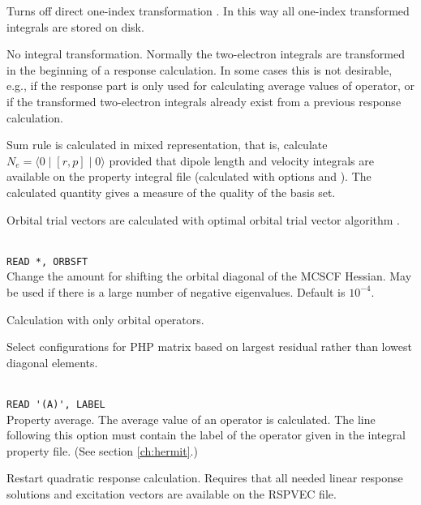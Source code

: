 \begin{description}
\item{}
Turns off direct one-index transformation \cite{ovhahjajjcc15}. 
In this way all one-index transformed integrals are stored on disk.

\item{}
No integral transformation. Normally the two-electron integrals are 
transformed in the beginning of a response calculation. In some cases
this is not desirable, e.g., if the response part is only used for
calculating average values of operator, or if the transformed two-electron
integrals already exist from a previous response calculation. 

\item{}
Sum rule is calculated in mixed representation, that is, calculate
$N_e=\langle0\mid [r,p] \mid0\rangle$ provided that dipole length and
velocity integrals are available on the property integral file 
(calculated with  options  and ).
The calculated quantity gives a measure of the quality of the basis
set.

\item{}
Orbital trial vectors are calculated with optimal orbital
trial vector
algorithm \cite{tuhjahjajpjjcp84}.

\item{}\\
\verb|READ *, ORBSFT|\\
Change the amount for shifting the orbital
diagonal of the MCSCF Hessian.
May be used if there is a large number of negative eigenvalues.
Default is $10^{-4}$. 

\item{}
Calculation with only orbital operators. 

\item{}
Select configurations for PHP matrix based on largest residual
rather than lowest diagonal elements.

\item{} \\
\verb|READ '(A)', LABEL|\\
Property average. The average value of an
operator is calculated. 
The line following this option must contain the
label of the operator given in the integral property file.
(See section \ref{ch:hermit}.)

\item{}
Restart quadratic response
calculation.
Requires that all needed linear response solutions and excitation vectors
are available on the RSPVEC file.
\end{description}

